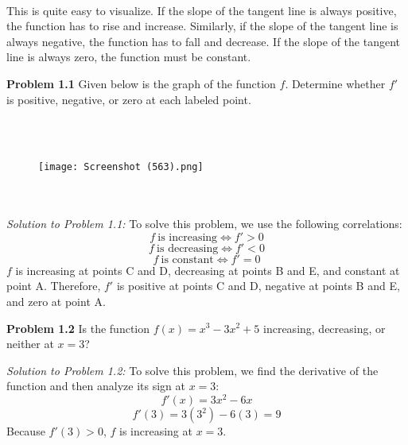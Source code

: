 \documentclass[11pt]{scrartcl}
\begin{document}
\\
\noindent 
This is quite easy to visualize. If the slope of the tangent line is always positive, the function has to rise and increase. Similarly, if the slope of the tangent line is always negative, the function has to fall and decrease. If the slope of the tangent line is always zero, the function must be constant. 
\newpage
\begin{tcolorbox}
[colback=purple!5!white,colframe=purple!75!black]
\textbf{Problem 1.1} Given below is the graph of the function $f$. Determine whether $f'$ is positive, negative, or zero at each labeled point.
\end{tcolorbox} \\
\\
\begin{figure}[htp]
    \centering
    \texttt{[image: Screenshot (563).png]}
\end{figure} \\
\\
\noindent 
\textit{Solution to Problem 1.1:} To solve this problem, we use the following correlations: 
$$f \ \text{is increasing} \Leftrightarrow f'>0$$
$$f \ \text{is decreasing} \Leftrightarrow f'<0$$
$$f \ \text{is constant} \Leftrightarrow f'=0$$
\noindent 
$f$ is increasing at points C and D, decreasing at points B and E, and constant at point A. Therefore, $f'$ is positive at points C and D, negative at points B and E, and zero at point A. 





\begin{tcolorbox}
[colback=purple!5!white,colframe=purple!75!black]
\textbf{Problem 1.2} Is the function $f(x)=x^3-3x^2+5$ increasing, decreasing, or neither at $x=3$? 
\end{tcolorbox}
\noindent
\textit{Solution to Problem 1.2:} To solve this problem, we find the derivative of the function and then analyze its sign at $x=3$: $$f'(x)=3x^2-6x$$
$$f'(3)=3(3^2)-6(3)=9$$
\noindent 
Because $f'(3)>0$, $f$ is increasing at $x=3$. 
\end{document}
